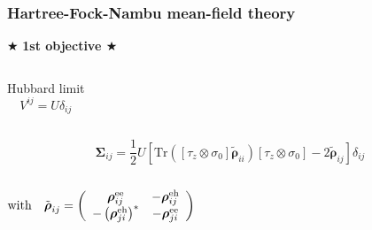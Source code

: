\documentclass{beamer}
\begin{document}
\begin{frame}
\frametitle{Hartree-Fock-Nambu mean-field theory}

\begin{center}
\Large \textcolor{red!80!black}{$\bigstar$ \textbf{1st objective $\bigstar$}}
\end{center}

\begin{columns}
\column{5cm}

\column{3cm}
\begin{block}{Hubbard limit}
\vspace*{-4mm}
\begin{equation*}
V^{ij}=U\delta_{ij}
\end{equation*}
\end{block}

\column{5cm}
\end{columns}

\begin{block}{}
\begin{equation*}
\boldsymbol{\Sigma}_{ij}=\frac{1}{2}U\left[\text{Tr}\left(\left[\tau_{z}\otimes\sigma_{0}\right]\tilde{\boldsymbol{\rho}}_{ii}\right)\left[\tau_{z}\otimes\sigma_{0}\right]-2\tilde{\boldsymbol{\rho}}_{ij}\right]\delta_{ij}
\end{equation*}
\end{block}

\begin{columns}
\column{2.5cm}

\column{7cm}
\begin{block}{}
\vspace*{-4.5mm}
\begin{equation*}
\text{with}\quad \tilde{\boldsymbol{\rho}}_{ij}=\left(\begin{array}{cc}
\boldsymbol{\rho}_{ij}^{\text{\text{ee}}} & -\boldsymbol{\rho}_{ij}^{\text{eh}}\\
-\left(\boldsymbol{\rho}_{ji}^{\text{eh}}\right)^{*} & -\boldsymbol{\rho}_{ji}^{\text{\text{ee}}}
\end{array}\right)
\end{equation*}
\end{block}

\column{2.5cm}
\end{columns}

\end{frame}
\end{document}
